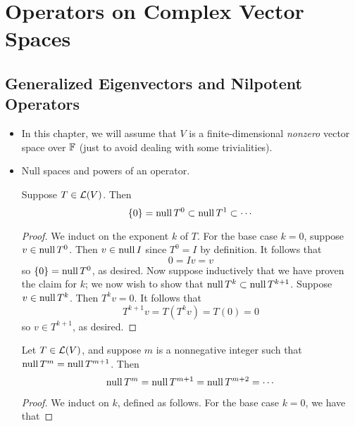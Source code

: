 \documentclass[../main.tex]{subfiles}
\begin{document}
\chapter{Operators on Complex Vector Spaces}
\section{Generalized Eigenvectors and Nilpotent Operators}
\begin{itemize}
    \item {}In this chapter, we will assume that $V$ is a finite-dimensional \emph{nonzero} vector space over $\mathbb{F}$ (just to avoid dealing with some trivialities).
    \item Null spaces and powers of an operator.
    \begin{theorem}\label{trm:nullExponentSequence}
        Suppose $T\in\mathcal{L}(V)$. Then
        \begin{equation*}
            \{0\} = \operatorname{null} T^0
            \subset \operatorname{null} T^1
            \subset \cdots
        \end{equation*}
        \begin{proof}
            We induct on the exponent $k$ of $T$. For the base case $k=0$, suppose $v\in\operatorname{null} T^0$. Then $v\in\operatorname{null} I$ since $T^0=I$ by definition. It follows that
            \begin{equation*}
                0 = Iv = v
            \end{equation*}
            so $\{0\}=\operatorname{null} T^0$, as desired. Now suppose inductively that we have proven the claim for $k$; we now wish to show that $\operatorname{null} T^k\subset\operatorname{null} T^{k+1}$. Suppose $v\in\operatorname{null} T^k$. Then $T^kv=0$. It follows that
            \begin{equation*}
                T^{k+1}v = T(T^kv) = T(0) = 0
            \end{equation*}
            so $v\in T^{k+1}$, as desired.
        \end{proof}
    \end{theorem}
    \begin{theorem}\label{trm:nullSequenceBound}
        Let $T\in\mathcal{L}(V)$, and suppose $m$ is a nonnegative integer such that $\operatorname{null} T^m=\operatorname{null} T^{m+1}$. Then
        \begin{equation*}
            \operatorname{null} T^m = \operatorname{null} T^{m+1}
            = \operatorname{null} T^{m+2}
            = \cdots
        \end{equation*}
        \begin{proof}
            We induct on $k$, defined as follows. For the base case $k=0$, we have that

\end{proof}
\end{theorem}
\end{itemize}
\end{document}
